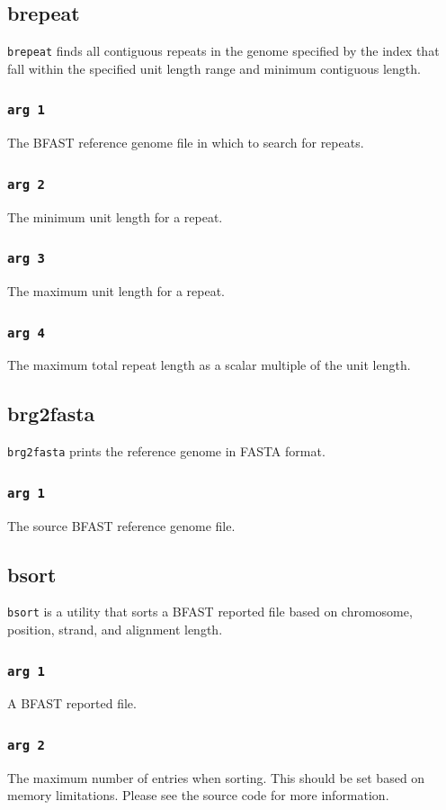 \documentclass[a4paper,12pt]{book}
\newcommand{\TT}[1]{{\tt #1}} %
\newcommand{\BRGF}{BFAST reference genome file} %
\newcommand{\BRF}{BFAST reported file} %
\begin{document}
\subsection{brepeat}
\label{sec:brepeat}
\TT{brepeat} finds all contiguous repeats in the genome specified by the index that fall within the specified unit length range and minimum contiguous length.
\subsubsection{\TT{arg 1}}
The \BRGF{} in which to search for repeats.
\subsubsection{\TT{arg 2}}
The minimum unit length for a repeat.
\subsubsection{\TT{arg 3}}
The maximum unit length for a repeat.
\subsubsection{\TT{arg 4}}
The maximum total repeat length as a scalar multiple of the unit length.
\subsection{brg2fasta}
\label{sec:brg2fasta}
\TT{brg2fasta} prints the reference genome in FASTA format.
\subsubsection{\TT{arg 1}}
The source \BRGF{}.
\subsection{bsort}
\label{sec:bsort}
\TT{bsort} is a utility that sorts a \BRF{} based on chromosome, position, strand, and alignment length.
\subsubsection{\TT{arg 1}}
A \BRF{}.
\subsubsection{\TT{arg 2}}
The maximum number of entries when sorting.
This should be set based on memory limitations.
Please see the source code for more information.
\end{document}
